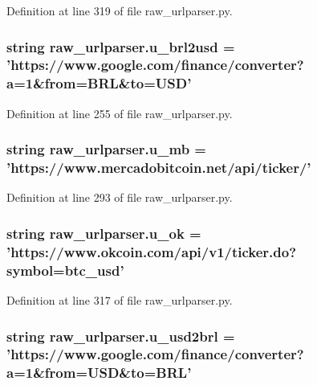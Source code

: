 Definition at line 319 of file raw\-\_\-urlparser.\-py.

\hypertarget{namespaceraw__urlparser_a876711ddd7ebb3991a35cc1768d1d22c}{
\subsubsection[{u\-\_\-brl2usd}]{\setlength{\rightskip}{0pt plus 5cm}string raw\-\_\-urlparser.\-u\-\_\-brl2usd = 'https\-://www.\-google.\-com/finance/converter?a=1\&from=B\-R\-L\&to=U\-S\-D'}}\label{namespaceraw__urlparser_a876711ddd7ebb3991a35cc1768d1d22c}


Definition at line 255 of file raw\-\_\-urlparser.\-py.

\hypertarget{namespaceraw__urlparser_a9a840f174b92a24c415b88c87e84b73d}{
\subsubsection[{u\-\_\-mb}]{\setlength{\rightskip}{0pt plus 5cm}string raw\-\_\-urlparser.\-u\-\_\-mb = 'https\-://www.\-mercadobitcoin.\-net/api/ticker/'}}\label{namespaceraw__urlparser_a9a840f174b92a24c415b88c87e84b73d}


Definition at line 293 of file raw\-\_\-urlparser.\-py.

\hypertarget{namespaceraw__urlparser_a22c1a17803a88426d38d70ad6d4290d2}{
\subsubsection[{u\-\_\-ok}]{\setlength{\rightskip}{0pt plus 5cm}string raw\-\_\-urlparser.\-u\-\_\-ok = 'https\-://www.\-okcoin.\-com/api/v1/ticker.\-do?symbol=btc\-\_\-usd'}}\label{namespaceraw__urlparser_a22c1a17803a88426d38d70ad6d4290d2}


Definition at line 317 of file raw\-\_\-urlparser.\-py.

\hypertarget{namespaceraw__urlparser_a63e1f0abe7b1f43c4891ce9aec98261d}{
\subsubsection[{u\-\_\-usd2brl}]{\setlength{\rightskip}{0pt plus 5cm}string raw\-\_\-urlparser.\-u\-\_\-usd2brl = 'https\-://www.\-google.\-com/finance/converter?a=1\&from=U\-S\-D\&to=B\-R\-L'}}\label{namespaceraw__urlparser_a63e1f0abe7b1f43c4891ce9aec98261d}


